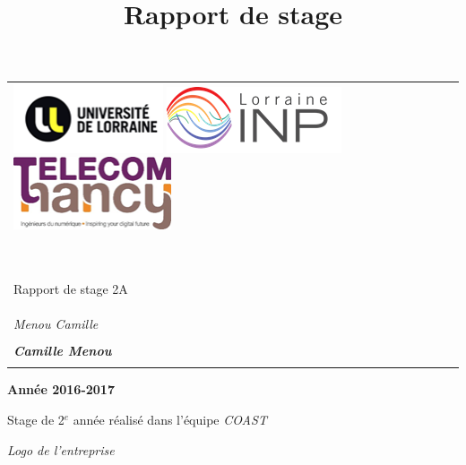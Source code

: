 \documentclass[12pt]{article}
\title{Rapport de stage}
\begin{document}
\begin{center}

\vspace{3pt} \noindent
\begin{tabular}{p{439pt}}
\parbox{439pt}{\centering \includegraphics[width=125pt]{gallery/img-3.png}\textbf{{\large 
\includegraphics[width=146pt]{gallery/img-2.png}
}}\includegraphics[width=132pt]{gallery/img-1.png}{\small  }} \\

$ $

\parbox{439pt}{\centering 
{\Huge Rapport de stage 2A}
} \\
\hline
\parbox{439pt}{\centering 
\textit{{\Huge Menou Camille}}
} \\
\parbox{439pt}{\centering } \\
\parbox{439pt}{\centering 
\textbf{\textit{{\Large Camille Menou}}}
} \\
\parbox{439pt}{\centering } \\
\end{tabular}
\vspace{2pt}

\end{center}



\begin{center}
\textbf{Ann\'{e}e 2016-2017}
\end{center}

\begin{center}
Stage de 2$^{e}$ année réalisé dans l'équipe \textit{COAST}
\end{center}

\begin{center}
\textit{Logo de l'entreprise}
\end{center}
\end{document}
